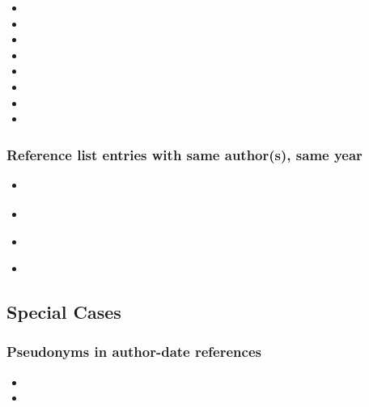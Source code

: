 \documentclass[11pt,letterpaper,oneside]{article}
\begin{document}
\begin{itemize}
\item[P] 

\item[R] 

\item[P] 

\item[R] 

\item[P] 

\item[R] 

\item[P] 

\item[R] 
\end{itemize}

\setcounter{subsubsection}{18}
\subsubsection{Reference list entries with same author(s), same year}
\label{15.19}

\begin{itemize}
\item[P] \parencite[218]{fogel2004b}

\item[R] 

\item[P] \parencite[45--46]{fogel2004a}

\item[R] 
\end{itemize}

\setcounter{subsection}{1}
\subsection{Special Cases}
\setcounter{subsection}{15}

\setcounter{subsubsection}{33}
\subsubsection{Pseudonyms in author-date references}

\begin{itemize}
\item[P] 

\item[R] 
\end{itemize}
\end{document}
